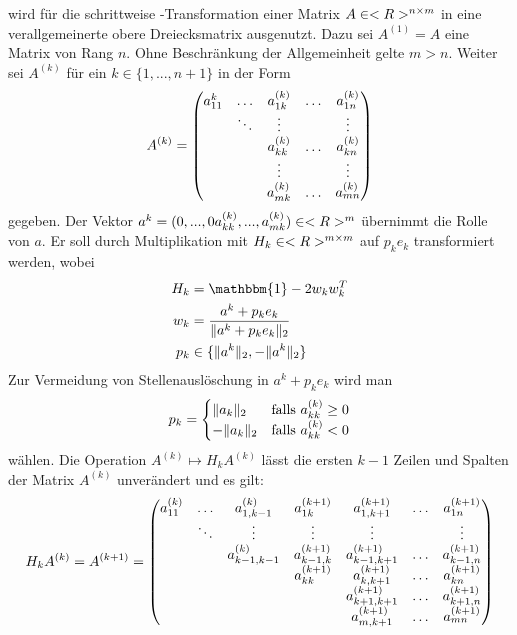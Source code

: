  wird für die schrittweise -Transformation einer Matrix $A\in<R>^{n\times m}$ in eine verallgemeinerte obere Dreiecksmatrix ausgenutzt. Dazu sei $A^{(1)}=A$ eine Matrix von Rang $n$. Ohne Beschränkung der Allgemeinheit gelte $m>n$. Weiter sei $A^{(k)}$ für ein $k\in\{1,...,n+1\}$ in der Form
\begin{align}
	A^{(k)} = \begin{pmatrix}
	a_{11}^{k} & \dots & a_{1k}^{(k)} & \dots & a_{1n}^{(k)} \\
	& \ddots & \vdots & & \vdots \\
	&& a_{kk}^{(k)} &  \dots & a_{kn}^{(k)} \\
	&& \vdots & & \vdots \\
	&& a_{mk}^{(k)} & \dots & a_{mn}^{(k)} 
	\end{pmatrix}\notag
\end{align}
gegeben. Der Vektor $a^k=(0,...,0a_{kk}^{(k)},...,a_{mk}^{(k)})\in<R>^m$ übernimmt die Rolle von $a$. Er soll durch Multiplikation mit $H_k\in<R>^{m\times m}$ auf $p_ke_k$ transformiert werden, wobei
\begin{align}
	H_k &= \mathbbm{1} - 2w_kw_k^T \notag \\
	w_k &= \frac{a^k+p_ke_k}{\Vert a^k+p_ke_k\Vert_2} \notag \\
	p_k &\in \{\Vert a^k\Vert_2,-\Vert a^k\Vert_2\} \notag
\end{align}
Zur Vermeidung von Stellenauslöschung in $a^k+p_ke_k$ wird man
\begin{align}
	p_k = \begin{cases}
	\Vert a_k\Vert_2 & \text{falls } a_{kk}^{(k)}\ge 0 \\
	-\Vert a_k\Vert_2 & \text{falls } a_{kk}^{(k)}<0
	\end{cases}\notag
\end{align}
wählen. Die Operation $A^{(k)}\mapsto H_kA^{(k)}$ lässt die ersten $k-1$ Zeilen und Spalten der Matrix $A^{(k)}$ unverändert und es gilt:
\begin{align}
	H_kA^{(k)} = A^{(k+1)}  = \begin{pmatrix}
	a_{11}^{(k)} & \dots & a_{1,k-1}^{(k)} & a_{1k}^{(k+1)} & a_{1,k+1}^{(k+1)} & \dots & a_{1n}^{(k+1)} \\
	& \ddots & \vdots  & \vdots & \vdots & & \vdots \\
	&& a_{k-1,k-1}^{(k)} & a_{k-1,k}^{(k+1)} & a_{k-1,k+1}^{(k+1)} & \dots & a_{k-1,n}^{(k+1)} \\
	&&& a_{kk}^{(k+1)} & a_{k,k+1}^{(k+1)} & \dots & a_{kn}^{(k+1)} \\
	&&&& a_{k+1,k+1}^{(k+1)} & \dots & a_{k+1,n}^{(k+1)} \\
	&&&& a_{m,k+1}^{(k+1)} & \dots & a_{mn}^{(k+1)}
	\end{pmatrix} \notag
\end{align}
